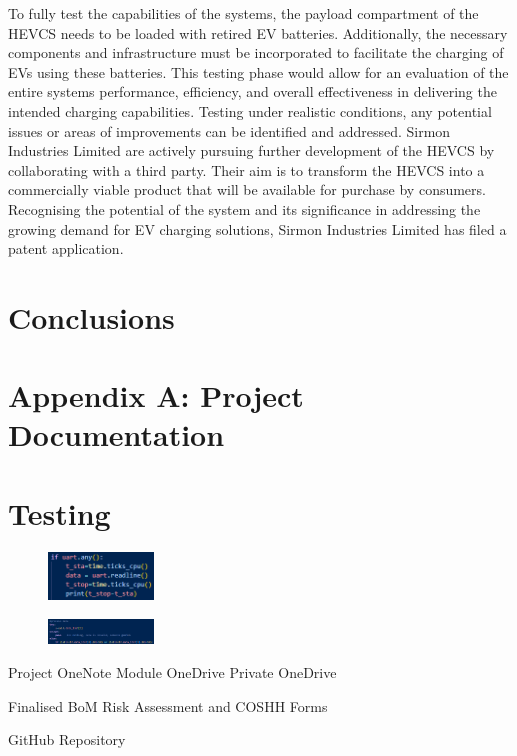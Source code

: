 \documentclass [12pt]{article}
\begin{document}
To fully test the capabilities of the systems, the payload compartment of the HEVCS needs to be loaded with retired EV batteries. Additionally, the necessary components and infrastructure must be incorporated to facilitate the charging of EVs using these batteries. This testing phase would allow for an evaluation of the entire systems performance, efficiency, and overall effectiveness in delivering the intended charging capabilities. Testing under realistic conditions, any potential issues or areas of improvements can be identified and addressed.
Sirmon Industries Limited are actively pursuing further development of the HEVCS by collaborating with a third party. Their aim is to transform the HEVCS into a commercially viable product that will be available for purchase by consumers. Recognising the potential of the system and its significance in addressing the growing demand for EV charging solutions, Sirmon Industries Limited has filed a patent application.


\newpage
\section{Conclusions}

\newpage



\newpage
\appendix

\section{Appendix A: Project Documentation}

\section{Testing}

\begin{figure}[h]
    \centering
    \includegraphics[width=0.25\textwidth]{uartTest.png}
    \caption{}
    \label{fig:uartTest}
\end{figure}

\begin{figure}[h]
    \centering
    \includegraphics[width=0.25\textwidth]{uartTestData.png}
    \caption{}
    \label{fig:uartTestData}
\end{figure}

Project OneNote \cite{onenote}
Module OneDrive \cite{unidrive}
Private OneDrive \cite{privdrive}

Finalised BoM \cite{bom}
Risk Assessment and COSHH Forms \cite{RA}

GitHub Repository \cite{}
\end{document}
